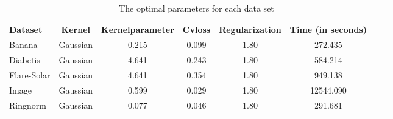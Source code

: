 \begin{table}
\begin{tabular}{l*{6}{c}r}
\centering
\textbf{Dataset}  & \textbf{Kernel} & \textbf{Kernelparameter} &  \textbf{Cvloss} & \textbf{Regularization} & \textbf{Time (in seconds)} \\
\hline
Banana & Gaussian & 0.215 & 0.099 & 1.80 & 272.435  \\
Diabetis            & Gaussian & 4.641 & 0.243 & 1.80 & 584.214  \\
Flare-Solar           & Gaussian & 4.641 & 0.354 & 1.80 & 949.138  \\
Image     & Gaussian & 0.599 & 0.029 & 1.80  & 12544.090 \\
Ringnorm     & Gaussian & 0.077 & 0.046 & 1.80 & 291.681 \\
\end{tabular}
\caption{The optimal parameters for each data set}
\label{tab:cv}
\end{table}




